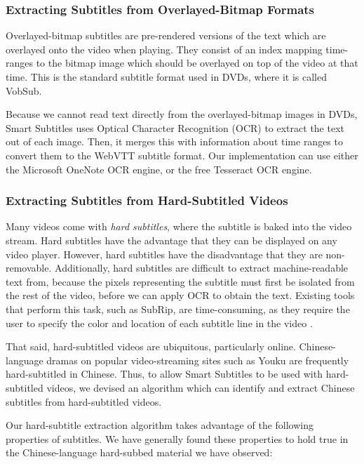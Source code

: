 \documentclass{sigchi}
\begin{document}
\subsubsection{Extracting Subtitles from Overlayed-Bitmap Formats}

Overlayed-bitmap subtitles are pre-rendered versions of the text which are overlayed onto the video when playing. They consist of an index mapping time-ranges to the bitmap image which should be overlayed on top of the video at that time. This is the standard subtitle format used in DVDs, where it is called VobSub.

Because we cannot read text directly from the overlayed-bitmap images in DVDs, Smart Subtitles uses Optical Character Recognition (OCR) to extract the text out of each image. Then, it merges this with information about time ranges to convert them to the WebVTT subtitle format. Our implementation can use either the Microsoft OneNote \cite{onenote} OCR engine, or the free Tesseract \cite{tesseract} OCR engine.

\subsubsection{Extracting Subtitles from Hard-Subtitled Videos}

Many videos come with \emph{hard subtitles}, where the subtitle is baked into the video stream. Hard subtitles have the advantage that they can be displayed on any video player. However, hard subtitles have the disadvantage that they are non-removable. Additionally, hard subtitles are difficult to extract machine-readable text from, because the pixels representing the subtitle must first be isolated from the rest of the video, before we can apply OCR to obtain the text. Existing tools that perform this task, such as SubRip, are time-consuming, as they require the user to specify the color and location of each subtitle line in the video \cite{subrip}.

That said, hard-subtitled videos are ubiquitous, particularly online. Chinese-language dramas on popular video-streaming sites such as Youku are frequently hard-subtitled in Chinese. Thus, to allow Smart Subtitles to be used with hard-subtitled videos, we devised an algorithm which can identify and extract Chinese subtitles from hard-subtitled videos.

Our hard-subtitle extraction algorithm takes advantage of the following properties of subtitles. We have generally found these properties to hold true in the Chinese-language hard-subbed material we have observed:
\end{document}
